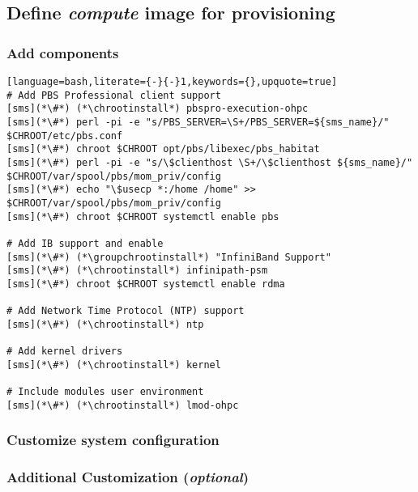 \documentclass[letterpaper]{article}
\newcommand{\chrootinstall}{yum -y --installroot=\$CHROOT install}
\newcommand{\groupchrootinstall}{yum -y --installroot=\$CHROOT groupinstall}
\begin{document}
\subsection{Define {\em compute} image for provisioning}


\subsubsection{Add \OHPC{} components} \label{sec:add_components}


\begin{lstlisting}[language=bash,literate={-}{-}1,keywords={},upquote=true]
# Add PBS Professional client support
[sms](*\#*) (*\chrootinstall*) pbspro-execution-ohpc
[sms](*\#*) perl -pi -e "s/PBS_SERVER=\S+/PBS_SERVER=${sms_name}/" $CHROOT/etc/pbs.conf
[sms](*\#*) chroot $CHROOT opt/pbs/libexec/pbs_habitat
[sms](*\#*) perl -pi -e "s/\$clienthost \S+/\$clienthost ${sms_name}/" $CHROOT/var/spool/pbs/mom_priv/config
[sms](*\#*) echo "\$usecp *:/home /home" >> $CHROOT/var/spool/pbs/mom_priv/config
[sms](*\#*) chroot $CHROOT systemctl enable pbs

# Add IB support and enable
[sms](*\#*) (*\groupchrootinstall*) "InfiniBand Support"
[sms](*\#*) (*\chrootinstall*) infinipath-psm
[sms](*\#*) chroot $CHROOT systemctl enable rdma

# Add Network Time Protocol (NTP) support
[sms](*\#*) (*\chrootinstall*) ntp

# Add kernel drivers
[sms](*\#*) (*\chrootinstall*) kernel

# Include modules user environment
[sms](*\#*) (*\chrootinstall*) lmod-ohpc
\end{lstlisting}

\subsubsection{Customize system configuration} \label{sec:master_customization}


\subsubsection{Additional Customization ({\em optional})} \label{sec:addl_customizations}

\end{document}
